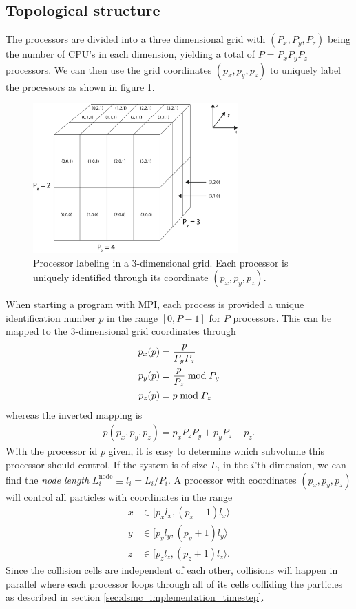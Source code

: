 \subsection{Topological structure}
The processors are divided into a three dimensional grid with $(P_x, P_y, P_z)$ being the number of CPU's in each dimension, yielding a total of $P = P_xP_yP_z$ processors. We can then use the grid coordinates $(p_x, p_y, p_z)$ to uniquely label the processors as shown in figure \ref{fig:dsmc_parallelization_2}.
\begin{figure}[htpb]
\begin{center}
\includegraphics[width=0.7\textwidth, trim=0cm 0cm 0cm 0cm, clip]{DSMC/figures/parallelization_node_configuration.eps}
\end{center}
\caption{Processor labeling in a 3-dimensional grid. Each processor is uniquely identified through its coordinate $(p_x, p_y, p_z)$.}
\label{fig:dsmc_parallelization_2}
\end{figure}
When starting a program with MPI, each process is provided a unique identification number $p$ in the range $[0, P-1]$ for $P$ processors. This can be mapped to the 3-dimensional grid coordinates through
\begin{align}
	\nonumber
	p_x(p) &= {p \over P_yP_z}\\
	\nonumber
	p_y(p) &= {p \over P_z} \bmod P_y\\
	p_z(p) &= p \bmod P_z
\end{align}
whereas the inverted mapping is 
\begin{align}
	p(p_x, p_y, p_z) = p_xP_zP_y + p_yP_z + p_z.
\end{align}
With the processor id $p$ given, it is easy to determine which subvolume this processor should control. If the system is of size $L_i$ in the $i$'th dimension, we can find the \textit{node length} $L_i^{\text{node}} \equiv l_i = L_i/P_i$. A processor with coordinates $(p_x, p_y, p_z)$ will control all particles with coordinates in the range
\begin{align}
	\nonumber
	x&\in[p_xl_x, (p_x+1)l_x\rangle\\
	\nonumber
	y&\in[p_yl_y, (p_y+1)l_y\rangle\\
	z&\in[p_zl_z, (p_z+1)l_z\rangle.
\end{align}
Since the collision cells are independent of each other, collisions will happen in parallel where each processor loops through all of its cells colliding the particles as described in section \ref{sec:dsmc_implementation_timestep}. 

